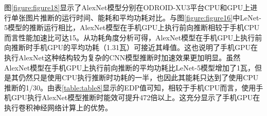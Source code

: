 \begin{table}[htbp]
  \centering
  \caption{AlexNet模型结构中的卷积层和全连接层}
  \label{table:table7}
\end{table}

图\ref{figure:figure18}显示了AlexNet模型分别在ODROID-XU3平台CPU和GPU上进行单张图片推断的运行时间、能耗和平均功耗对比。与图\ref{figure:figure16}中LeNet-5模型的推断运行相比，AlexNet模型在手机GPU上执行前向推断相较于手机CPU而言性能加速比可达15。从功耗角度分析可得，AlexNet模型在手机GPU上执行前向推断时手机GPU的平均功耗（1.31瓦）可接近其峰值。这也说明了手机GPU在执行AlexNet这种结构较为复杂的CNN模型推断时加速效果更加明显。虽然AlexNet模型在手机GPU上执行前向推断的平均功耗比LeNet-5模型增加了1瓦，但是其仍然只是使用CPU执行推断时功耗的一半，也因此其能耗只达到了使用CPU推断的1/30。由表\ref{table:table8}显示的EDP值可知，相较于手机CPU而言，使用手机GPU执行AlexNet模型推断时能效可提升472倍以上。这充分显示了手机GPU在执行卷积神经网络计算上的优势。

